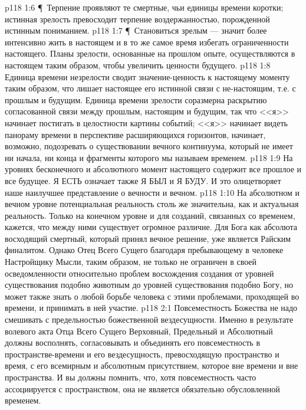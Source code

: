 \vs p118 1:6 \P\ Терпение проявляют те смертные, чьи единицы времени коротки; истинная зрелость превосходит терпение воздержанностью, порожденной истинным пониманием.
\vs p118 1:7 \P\ Становиться зрелым --- значит более интенсивно жить в настоящем и в то же самое время избегать ограниченности настоящего. Планы зрелости, основанные на прошлом опыте, осуществляются в настоящем таким образом, чтобы увеличить ценности будущего.
\vs p118 1:8 Единица времени незрелости сводит значение\hyp{}ценность к настоящему моменту таким образом, что лишает настоящее его истинной связи с не\hyp{}настоящим, т.е. с прошлым и будущим. Единица времени зрелости соразмерна раскрытию согласованной связи между прошлым, настоящим и будущим, так что <<я>> начинает постигать в целостности картины событий; <<я>> начинает видеть панораму времени в перспективе расширяющихся горизонтов, начинает, возможно, подозревать о существовании вечного континуума, который не имеет ни начала, ни конца и фрагменты которого мы называем временем.
\vs p118 1:9 На уровнях бесконечного и абсолютного момент настоящего содержит все прошлое и все будущее. Я ЕСТЬ означает также Я БЫЛ и Я БУДУ. И это олицетворяет наше наилучшее представление о вечности и вечном.
\vs p118 1:10 На абсолютном и вечном уровне потенциальная реальность столь же значительна, как и актуальная реальность. Только на конечном уровне и для созданий, связанных со временем, кажется, что между ними существует огромное различие. Для Бога как абсолюта восходящий смертный, который принял вечное решение, уже является Райским финалитом. Однако Отец Всего Сущего благодаря пребывающему в человеке Настройщику Мысли, таким образом, не только не ограничен в своей осведомленности относительно проблем восхождения создания от уровней существования подобно животным до уровней существования подобно Богу, но может также знать о любой борьбе человека с этими проблемами, проходящей во времени, и принимать в ней участие.
\vs p118 2:1 Повсеместность Божества не надо смешивать с предельностью божественной вездесущности. Именно в результате волевого акта Отца Всего Сущего Верховный, Предельный и Абсолютный должны восполнять, согласовывать и объединять его повсеместность в пространстве\hyp{}времени и его вездесущность, превосходящую пространство и время, с его всемирным и абсолютным присутствием, которое вне времени и вне пространства. И вы должны помнить, что, хотя повсеместность часто ассоциируется с пространством, она не является обязательно обусловленной временем.
